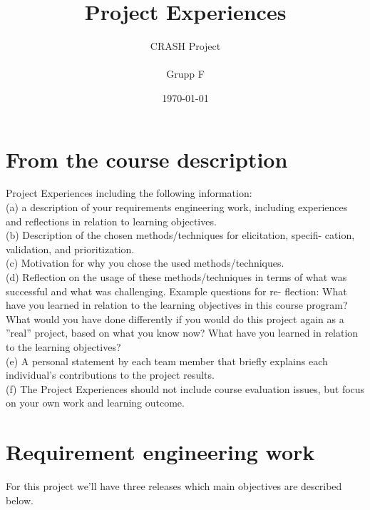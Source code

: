 \documentclass[10pt]{article}
\title{Project Experiences}
\author{CRASH Project
\\
\\ Grupp F}
\date{}
\begin{document}
\date{\today}
\begin{titlepage}
\clearpage
  \maketitle
\thispagestyle{empty}

\end{titlepage}


\tableofcontents
\thispagestyle{empty}
\newpage
{}

\section{From the course description}
\sloppy
\noindent
Project Experiences including the following information:
\\(a) a description of your requirements engineering work, including experiences
and reflections in relation to learning objectives.
\\(b) Description of the chosen methods/techniques for elicitation, specifi-
cation, validation, and prioritization.
\\(c) Motivation for why you chose the used methods/techniques.
\\(d) Reflection on the usage of these methods/techniques in terms of what
was successful and what was challenging. Example questions for re-
flection: What have you learned in relation to the learning objectives
in this course program? What would you have done differently if you
would do this project again as a ”real” project, based on what you know
now? What have you learned in relation to the learning objectives?
\\(e) A personal statement by each team member that briefly explains each
individual’s contributions to the project results.
\\(f) The Project Experiences should not include course evaluation issues,
but focus on your own work and learning outcome.
\newline

\section{Requirement engineering work}
For this project we'll have three releases which main objectives are described below.
\end{document}
